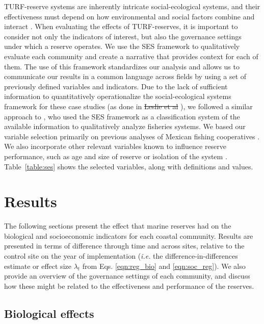 \documentclass[10pt,letterpaper]{article}
\providecommand{\DIFdeltex}[1]{{\protect\color{red}\sout{#1}}}                      %
\providecommand{\DIFdelbegin}{} %
\providecommand{\DIFdelend}{} %
\providecommand{\DIFdel}[1]{\texorpdfstring{\DIFdeltex{#1}}{}} %
\newcommand{\DIFscaledelfig}{0.5}
\newlength{\DIFdelgraphicswidth} %
\newlength{\DIFdelgraphicsheight} %
\newcommand{\DIFdelincludegraphics}[2][]{%
\sbox{\DIFdelgraphicsbox}{\DIFOincludegraphics[#1]{#2}}%
\settoboxwidth{\DIFdelgraphicswidth}{\DIFdelgraphicsbox} %
\settoboxtotalheight{\DIFdelgraphicsheight}{\DIFdelgraphicsbox} %
\scalebox{\DIFscaledelfig}{%
\parbox[b]{\DIFdelgraphicswidth}{\usebox{\DIFdelgraphicsbox}\\[-\baselineskip] \rule{\DIFdelgraphicswidth}{0em}}\llap{\resizebox{\DIFdelgraphicswidth}{\DIFdelgraphicsheight}{%
\setlength{\unitlength}{\DIFdelgraphicswidth}%
\begin{picture}(1,1)%
\thicklines\linethickness{2pt} %
{\color[rgb]{1,0,0}\put(0,0){\framebox(1,1){}}}%
{\color[rgb]{1,0,0}\put(0,0){\line( 1,1){1}}}%
{\color[rgb]{1,0,0}\put(0,1){\line(1,-1){1}}}%
\end{picture}%
}\hspace*{3pt}}} %
} %
\DeclareRobustCommand{\DIFdelbegin}{\DIFOdelbegin \let\includegraphics\DIFdelincludegraphics} %
\DeclareRobustCommand{\DIFdelend}{\DIFOaddend \let\includegraphics\DIFOincludegraphics} %
\begin{document}
TURF-reserve systems are inherently intricate social-ecological systems, and their effectiveness must depend on how environmental and social factors combine and interact \cite{ostrom_2009,gelcich_2015}. When evaluating the effects of TURF-reserves, it is important to consider not only the indicators of interest, but also the governance settings under which a reserve operates. We use the SES framework to qualitatively evaluate each community and create a narrative that provides context for each of them. The use of this framework standardizes our analysis and allows us to communicate our results in a common language across fields by using a set of previously defined variables and indicators. Due to the lack of sufficient information to quantitatively operationalize the social-ecological systems framework for these case studies (as done in \DIFdelbegin \DIFdel{Leslie et al }\DIFdelend \cite{leslie_2015-na}), we followed a similar approach to \cite{basurto_2013-oq}, who used the SES framework as a classification system of the available information to qualitatively analyze fisheries systems. We based our variable selection primarily on previous analyses of Mexican fishing cooperatives \cite{leslie_2015-na,basurto_2013-oq}. We also incorporate other relevant variables known to influence reserve performance, such as age and size of reserve or isolation of the system \cite{difranco_2016-Xw,edgar_2014-UO}. Table~\ref{table:ses} shows the selected variables, along with definitions and values.

\section*{Results}

The following sections present the effect that marine reserves had on the biological and socioeconomic indicators for each coastal community. Results are presented in terms of difference through time and across sites, relative to the control site on the year of implementation (\emph{i.e.} the difference-in-differences estimate or effect size $\lambda_t$ from Eqs. \ref{eqn:reg_bio} and \ref{eqn:soc_reg}). We also provide an overview of the governance settings of each community, and discuss how these might be related to the effectiveness and performance of the reserves.

\subsection*{Biological effects}
\end{document}
